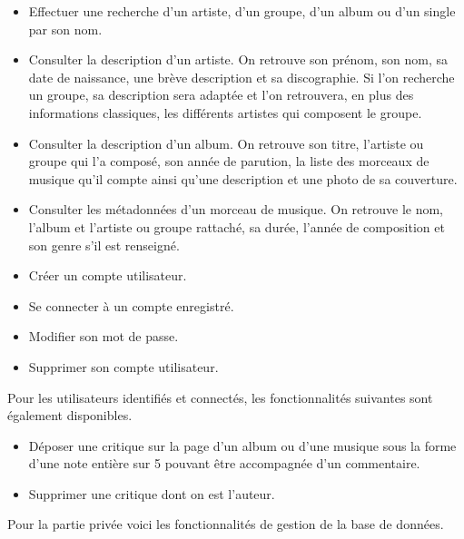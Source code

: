     \begin{paragraphe}
      \begin{itemize}
        \item Effectuer une recherche d'un artiste, d'un groupe, d'un album ou d'un single
          par son nom.
        \item Consulter la description d'un artiste. On retrouve son prénom, son nom, sa
          date de naissance, une brève description et sa discographie. Si l'on
          recherche un groupe, sa description sera adaptée et l'on retrouvera,
          en plus des informations classiques, les différents artistes qui
          composent le groupe.
        \item Consulter la description d'un album. On retrouve son titre,
          l'artiste ou groupe qui l'a composé, son année de parution, la liste des morceaux de musique
          qu'il compte ainsi qu'une description et une photo de sa couverture.
        \item Consulter les métadonnées d'un morceau de musique. On retrouve
          le nom, l'album et l'artiste ou groupe rattaché, sa durée, l'année de composition
          et son genre s'il est renseigné.
        \item Créer un compte utilisateur.
        \item Se connecter à un compte enregistré.
        \item Modifier son mot de passe.
        \item Supprimer son compte utilisateur.
      \end{itemize}
    \end{paragraphe}

    \begin{paragraphe}
      Pour les utilisateurs identifiés et connectés, les fonctionnalités suivantes sont également disponibles.
    \end{paragraphe}

    \begin{paragraphe}
      \begin{itemize}
        \item Déposer une critique sur la page d'un album ou
          d'une musique sous la forme d'une note entière sur 5 pouvant être accompagnée d'un commentaire.
        \item Supprimer une critique dont on est l'auteur.
      \end{itemize}
    \end{paragraphe}

    \begin{paragraphe}
      Pour la partie privée voici les fonctionnalités de gestion de la base de
      données.
    \end{paragraphe}

